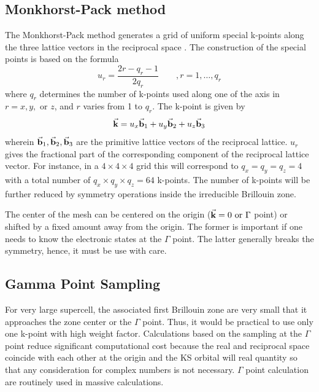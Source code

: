 \subsection{Monkhorst-Pack method}
The Monkhorst-Pack method generates a grid of uniform special k-points along the three lattice vectors in the reciprocal space \citep{Monkhorst1976}. The construction of the special points is based on the formula
\begin{equation}
    u_{r} = \frac{2r - q_r -1}{2 q_r} \qquad , r = 1, \dots, q_r
\end{equation}
where $q_r$ determines the number of k-points  used along one of the axis in $r = x, y, {\text{ or }} z$, and  $r$ varies from 1 to $q_r$. The k-point is given by
\begin{equation}
    \va{k} = u_x \va{b}_1 + u_y \va{b}_2 + u_z \va{b}_3
\end{equation}
wherein $\va{b}_1, \va{b}_2, \va{b}_3$ are the primitive lattice vectors of the reciprocal lattice. $u_r$ gives the fractional part of the corresponding component of the reciprocal lattice vector. For instance, in a $4 \times 4 \times 4$ grid this will correspond to $q_x = q_y = q_z = 4$ with a total number of $q_x \times q_y \times q_z = 64$ k-points. The number of k-points will be further reduced by symmetry operations inside the irreducible Brillouin zone. 

The center of the mesh can be centered on the origin ($\va{k} = 0  \text{ or } \Gamma$ point) or shifted by a fixed amount away from the origin. The former is important if one needs to know the electronic states at the $\Gamma$ point. The latter generally breaks the symmetry, hence, it must be use with care. 



\subsection{Gamma Point Sampling}
For very large supercell, the associated first Brillouin zone are very small that it approaches the zone center or the $\Gamma$ point. Thus, it would be practical to use only one k-point  with high weight factor. Calculations based on the sampling at the $\Gamma$ point reduce significant computational cost because the real and reciprocal space coincide with each  other at the origin and the KS orbital will real quantity so that any consideration for complex numbers is not necessary. $\Gamma$ point calculation are routinely used in massive calculations. 

